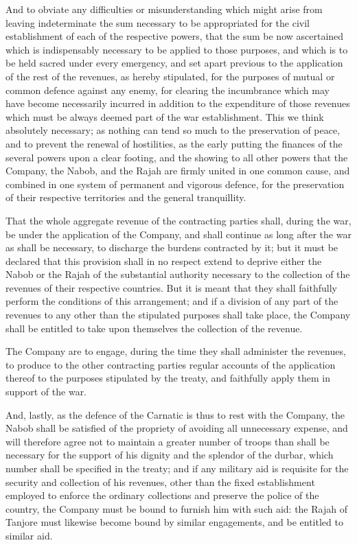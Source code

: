 And to obviate any difficulties or misunderstanding which might arise from leaving indeterminate the sum necessary to be appropriated for the civil establishment of each of the respective powers, that the sum be now ascertained which is indispensably necessary to be applied to those purposes, and which is to be held sacred under every emergency, and set apart previous to the application of the rest of the revenues, as hereby stipulated, for the purposes of mutual or common defence against any enemy, for clearing the incumbrance which may have become necessarily incurred in addition to the expenditure of those revenues which must be always deemed part of the war establishment. This we think absolutely necessary; as nothing can tend so much to the preservation of peace, and to prevent the renewal of hostilities, as the early putting the finances of the several powers upon a clear footing, and the showing to all other powers that the Company, the Nabob, and the Rajah are firmly united in one common cause, and combined in one system of permanent and vigorous defence, for the preservation of their respective territories and the general tranquillity.

That the whole aggregate revenue of the contracting parties shall, during the war, be under the application of the Company, and shall continue as long after the war as shall be necessary, to discharge the burdens contracted by it; but it must be declared that this provision shall in no respect extend to deprive either the Nabob or the Rajah of the substantial authority necessary to the collection of the revenues of their respective countries. But it is meant that they shall faithfully perform the conditions of this arrangement; and if a division of any part of the revenues to any other than the stipulated purposes shall take place, the Company shall be entitled to take upon themselves the collection of the revenue.

The Company are to engage, during the time they shall administer the revenues, to produce to the other contracting parties regular accounts of the application thereof to the purposes stipulated by the treaty, and faithfully apply them in support of the war.

And, lastly, as the defence of the Carnatic is thus to rest with the Company, the Nabob shall be satisfied of the propriety of avoiding all unnecessary expense, and will therefore agree not to maintain a greater number of troops than shall be necessary for the support of his dignity and the splendor of the durbar, which number shall be specified in the treaty; and if any military aid is requisite for the security and collection of his revenues, other than the fixed establishment employed to enforce the ordinary collections and preserve the police of the country, the Company must be bound to furnish him with such aid: the Rajah of Tanjore must likewise become bound by similar engagements, and be entitled to similar aid.

